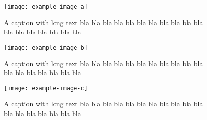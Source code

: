 \documentclass{article}
\begin{document}
\begin{figure}[hp]
\centering

\texttt{[image: example-image-a]}

\caption{A caption with long text bla bla bla bla bla bla bla bla
bla bla bla bla bla bla bla bla bla bla}
\end{figure}

\begin{figure}[hp]
\centering
\captionsetup{justification=centering}

\texttt{[image: example-image-b]}

\caption{A caption with long text bla bla bla bla bla bla bla bla
bla bla bla bla bla bla bla bla bla bla}
\end{figure}

\begin{figure}[hp]
\centering
\captionsetup{justification=centering,margin=2cm}

\texttt{[image: example-image-c]}

\caption{A caption with long text bla bla bla bla bla bla bla bla
bla bla bla bla bla bla bla bla bla bla}
\end{figure}
\end{document}

